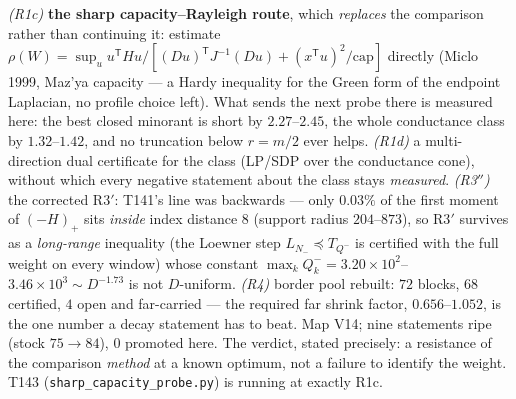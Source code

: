 \documentclass[11pt,a4paper]{article}
\begin{document}
\begin{keybox}
\emph{(R1c)} \textbf{the sharp capacity--Rayleigh route}, which \emph{replaces} the comparison
rather than continuing it: estimate
$\rho(W)=\sup_u u^{\mathsf T}Hu/[(Du)^{\mathsf T}J^{-1}(Du)+(x^{\mathsf T}u)^2/\mathrm{cap}]$
directly (Miclo 1999, Maz'ya capacity --- a Hardy inequality for the Green form of the endpoint
Laplacian, no profile choice left). What sends the next probe there is measured here: the best
closed minorant is short by $2.27$--$2.45$, the whole conductance class by $1.32$--$1.42$, and
no truncation below $r=m/2$ ever helps. \emph{(R1d)} a multi-direction dual certificate for the
class (LP/SDP over the conductance cone), without which every negative statement about the class
stays \emph{measured}. \emph{(R3$''$)} the corrected R3$'$: T141's line was backwards --- only
$0.03\%$ of the first moment of $(-H)_+$ sits \emph{inside} index distance $8$ (support radius
$204$--$873$), so R3$'$ survives as a \emph{long-range} inequality (the Loewner step
$L_{N_-}\preceq T_{Q^-}$ is certified with the full weight on every window) whose constant
$\max_kQ^-_k=3.20\times10^{2}$--$3.46\times10^{3}\sim D^{-1.73}$ is not $D$-uniform. \emph{(R4)}
border pool rebuilt: $72$ blocks, $68$ certified, $4$ open and far-carried --- the required far
shrink factor, $0.656$--$1.052$, is the one number a decay statement has to beat. Map V14; nine
statements ripe (stock $75\to84$), $0$ promoted here. The verdict, stated precisely: a
resistance of the comparison \emph{method} at a known optimum, not a failure to identify the
weight. T143 (\texttt{sharp\_capacity\_probe.py}) is running at exactly R1c.
\end{keybox}
\end{document}
